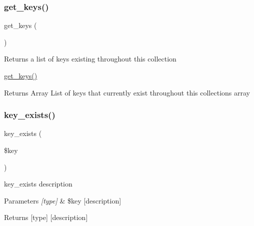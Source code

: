 \subsubsection{\texorpdfstring{get\+\_\+keys()}{get\_keys()}}
{\footnotesize\ttfamily get\+\_\+keys (\begin{DoxyParamCaption}{ }\end{DoxyParamCaption})}

Returns a list of keys existing throughout this collection

\hyperlink{class_w_a_f_f_l_e_1_1_framework_1_1_assembly_1_1_collection_a72540410e5d139cfba23a4f39ecc32be}{get\+\_\+keys()}

\begin{DoxyReturn}{Returns}
Array List of keys that currently exist throughout this collection\textquotesingle{}s array 
\end{DoxyReturn}
\mbox{\label{class_w_a_f_f_l_e_1_1_framework_1_1_assembly_1_1_collection_a9fd43b991d5a266daff254f49c24bf8e}} 
\subsubsection{\texorpdfstring{key\+\_\+exists()}{key\_exists()}}
{\footnotesize\ttfamily key\+\_\+exists (\begin{DoxyParamCaption}\item[{}]{\$key }\end{DoxyParamCaption})}

key\+\_\+exists description


\begin{DoxyParams}{Parameters}
{\em \mbox{[}type\mbox{]}} & \$key \mbox{[}description\mbox{]} \\
\hline
\end{DoxyParams}
\begin{DoxyReturn}{Returns}
\mbox{[}type\mbox{]} \mbox{[}description\mbox{]} 
\end{DoxyReturn}
\mbox{\label{class_w_a_f_f_l_e_1_1_framework_1_1_assembly_1_1_collection_a5facb816a7ce2173a30db9b0bc8ecf75}} 
